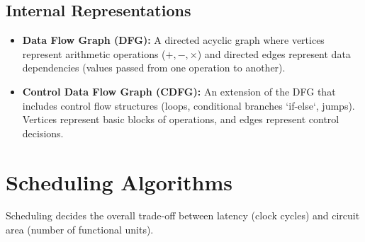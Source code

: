 \documentclass[12pt,a4paper]{article}
\begin{document}
\subsection{Internal Representations}
\begin{itemize}[leftmargin=*, itemsep=2pt]
  \item \textbf{Data Flow Graph (DFG):} A directed acyclic graph where vertices represent arithmetic operations ($+, -, \times$) and directed edges represent data dependencies (values passed from one operation to another).
  \item \textbf{Control Data Flow Graph (CDFG):} An extension of the DFG that includes control flow structures (loops, conditional branches `if-else`, jumps). Vertices represent basic blocks of operations, and edges represent control decisions.
\end{itemize}

\begin{tcolorbox}[tikzbox, title={Data Flow Graph for $y = (a + b) \cdot (c - d)$}]
\centering
{}
\end{tcolorbox}

\section{Scheduling Algorithms}

Scheduling decides the overall trade-off between latency (clock cycles) and circuit area (number of functional units).
\end{document}
